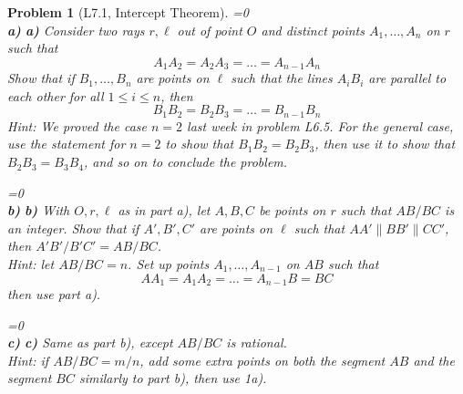 \documentclass[a4paper,12pt]{article}
\theoremstyle{perfect}
\newtheorem{prb}{Problem}
\newcommand{\varline}{0}
\renewcommand\part[1]{
\ifnum\pdfstrcmp{\varline}{1}=0
    \vspace{.10in}\textbf{\\#1)}
  \else
    \textbf{#1)}
  \fi\renewcommand{\varline}{1}}
\begin{document}
\begin{prb}[L7.1, Intercept Theorem]
\part{a} Consider two rays $r, \ell$ out of point $O$ and distinct points $A_1, \ldots, A_n$ on $r$ such that $$A_1A_2 = A_2A_3  = \ldots = A_{n-1}A_n$$ Show that if $B_1, \ldots, B_n$ are points on $\ell$ such that the lines $A_iB_i$ are parallel to each other for all $1 \leq i \leq n$, then $$B_1B_2 = B_2B_3  = \ldots = B_{n-1}B_n$$ \textit{Hint: We proved the case $n=2$ last week in problem L6.5. For the general case, use the statement for $n=2$ to show that $B_1B_2 = B_2B_3$, then use it to show that $B_2B_3 = B_3B_4$, and so on to conclude the problem.}
\part{b} With $O, r, \ell$ as in part a), let $A, B, C$ be points on $r$ such that $AB/BC$ is an integer. Show that if $A', B', C'$ are points on $\ell$ such that $AA' \parallel BB' \parallel CC'$, then $A'B'/B'C' = AB/BC$.\\
\textit{Hint: let $AB/BC = n$. Set up points $A_1, \ldots, A_{n-1}$ on $AB$ such that $$AA_1  = A_1A_2 = \ldots = A_{n-1}B = BC$$ then use part a).}
\part{c} Same as part b), except $AB/BC$ is rational.\\
\textit{Hint: if $AB/BC = m/n$, add some extra points on both the segment $AB$ and the segment $BC$ similarly to part b), then use 1a).}
\end{prb}
\end{document}
